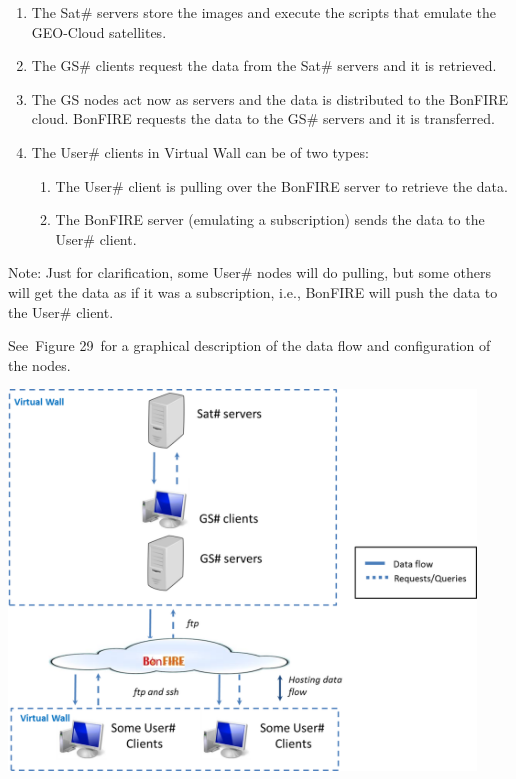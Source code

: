 \documentclass[a4paper]{article}
\newcounter{saveenum}
\newcommand\liststyleLFOxxxv{%
\renewcommand\theenumi{\arabic{enumi}}
\renewcommand\theenumii{\alph{enumii}}
\renewcommand\theenumiii{\roman{enumiii}}
\renewcommand\theenumiv{\arabic{enumiv}}
\renewcommand\labelenumi{\theenumi.}
\renewcommand\labelenumii{\theenumii.}
\renewcommand\labelenumiii{\theenumiii.}
\renewcommand\labelenumiv{\theenumiv.}
}
\begin{document}
\liststyleLFOxxxv
\setcounter{saveenum}{\value{enumi}}
\begin{enumerate}
\setcounter{enumi}{\value{saveenum}}
\item The Sat\# servers store the images and execute the scripts that
emulate the GEO-Cloud satellites.
\item The GS\# clients request the data from the Sat\# servers and it is
retrieved.
\item The GS nodes act now as servers and the data is distributed to the
BonFIRE cloud. BonFIRE requests the data to the GS\# servers and it is
transferred.\ 
\item The User\# clients in Virtual Wall can be of two types:

\setcounter{saveenum}{\value{enumii}}
\begin{enumerate}
\setcounter{enumii}{\value{saveenum}}
\item The User\# client is pulling over the BonFIRE server to retrieve
the data.
\item The BonFIRE server (emulating a subscription) sends the data to
the User\# client.
\end{enumerate}
\end{enumerate}
Note: Just for clarification, some User\# nodes will do pulling, but
some others will get the data as if it was a subscription, i.e.,
BonFIRE will push the data to the User\# client.

See\ Figure 29\ for a graphical description of the data flow and
configuration of the nodes.


\bigskip


\bigskip

{\centering 
\includegraphics[width=4.8855in,height=3.98068in]{out-img46.png} \par}
\end{document}
